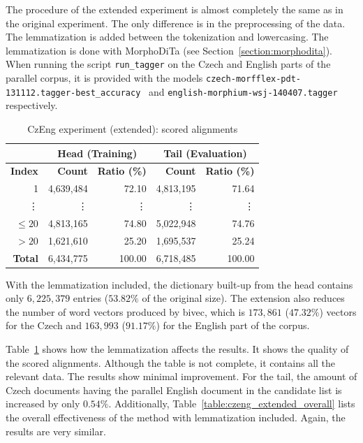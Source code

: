 The procedure of the extended experiment is almost completely the same as in the original experiment. The only difference is in the preprocessing of the data. The lemmatization is added between the tokenization and lowercasing. The lemmatization is done with MorphoDiTa (see Section~\ref{section:morphodita}). When running the script \texttt{run\_tagger} on the Czech and English parts of the parallel corpus, it is provided with the models \texttt{czech-morfflex-pdt-131112.tagger-best\_accuracy}~\cite{Straka13} and \texttt{english-morphium-wsj-140407.tagger}~\cite{Straka14} respectively.

\begin{table}[!htb]
	\centering
	\caption{CzEng experiment (extended): scored alignments}
	\label{table:czeng_extended_score}
	\vspace{1em}
	\begin{tabular}{|r||r|r||r|r|}
		\hline
		& \multicolumn{2}{c||}{\textbf{Head (Training)}} & \multicolumn{2}{c|}{\textbf{Tail (Evaluation)}} \\
		\hline
		\textbf{Index} & \textbf{Count} & \textbf{Ratio (\%)} & \textbf{Count} & \textbf{Ratio (\%)} \\ \hline
		1 & 4,639,484 & 72.10 & 4,813,195 & 71.64 \\
		\vdots & \vdots & \vdots & \vdots & \vdots \\
		\hline
		$\leq 20$ &  4,813,165 & 74.80 & 5,022,948 & 74.76 \\
		$> 20$ & 1,621,610 & 25.20 & 1,695,537 & 25.24 \\
		\hline
		\textbf{Total} & 6,434,775 & 100.00 & 6,718,485 & 100.00 \\
		\hline
	\end{tabular}
\end{table}

With the lemmatization included, the dictionary built-up from the head contains only $6,225,379$ entries ($53.82\%$ of the original size). The extension also reduces the number of word vectors produced by bivec, which is  $173,861$ ($47.32\%$) vectors for the Czech and $163,993$ ($91.17\%$) for the English part of the corpus.

Table~\ref{table:czeng_extended_score} shows how the lemmatization affects the results. It shows the quality of the scored alignments. Although the table is not complete, it contains all the relevant data. The results show minimal improvement. For the tail, the amount of Czech documents having the parallel English document in the candidate list is increased by only $0.54\%$. Additionally, Table~\ref{table:czeng_extended_overall} lists the overall effectiveness of the method with lemmatization included. Again, the results are very similar.

